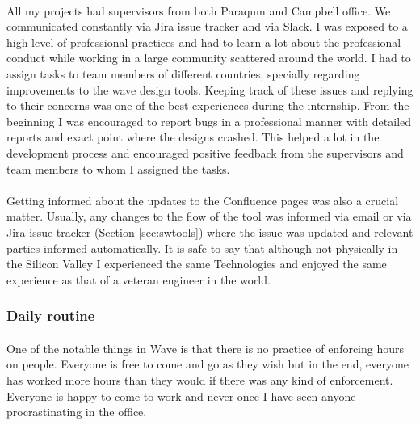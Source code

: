 \paragraph{}
All my projects had supervisors from both Paraqum and Campbell office. We communicated constantly via Jira issue tracker and via Slack. I was exposed to a high level of professional practices and had to learn a lot about the professional conduct while working in a large community scattered around the world. I had to assign tasks to team members of different countries, specially regarding improvements to the wave design tools. Keeping track of these issues and replying to their concerns was one of the best experiences during the internship. From the beginning I was encouraged to report bugs in a professional manner with detailed reports and exact point where the designs crashed. This helped a lot in the development process and encouraged positive feedback from the supervisors and team members to whom I assigned the tasks. 

\paragraph{}
Getting informed about the updates to the Confluence pages was also a crucial matter. Usually, any changes to the flow of the tool was informed via email or via Jira issue tracker (Section \ref{sec:swtools}) where the issue was updated and relevant parties informed automatically. It is safe to say that although not physically in the Silicon Valley I experienced the same Technologies and enjoyed the same experience as that of a veteran engineer in the world. 

\subsubsection{Daily routine}
\paragraph{}
One of the notable things in Wave is that there is no practice of enforcing hours on people. Everyone is free to come and go as they wish but in the end, everyone has worked more hours than they would if there was any kind of enforcement. Everyone is happy to come to work and never once I have seen anyone procrastinating in the office. 

